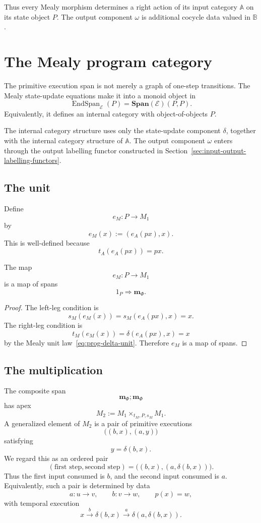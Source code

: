 Thus every Mealy morphism determines a right action of its input category \(\mathbb A\) on its state object \(P\). The output component \(\omega\) is additional cocycle data valued in \(\mathbb B\).

\section{The Mealy program category}
\label{sec:mealy-program-category}

The primitive execution span is not merely a graph of one-step transitions. The Mealy state-update equations make it into a monoid object in
\[
\operatorname{EndSpan}_{\mathcal E}(P)
=
\mathbf{Span}(\mathcal E)(P,P).
\]
Equivalently, it defines an internal category with object-of-objects \(P\).

The internal category structure uses only the state-update component \(\delta\), together with the internal category structure of \(\mathbb A\). The output component \(\omega\) enters through the output labelling functor constructed in Section~\ref{sec:input-output-labelling-functors}.

\subsection{The unit}

Define
\[
e_M:P\to M_1
\]
by
\[
e_M(x):=(e_A(p x),x).
\]
This is well-defined because
\[
t_A(e_A(p x))=p x.
\]

\begin{proposition}
\label{prop:program-unit-span-map}
The map
\[
e_M:P\to M_1
\]
is a map of spans
\[
1_P\Rightarrow \mathbf m_\Phi.
\]
\end{proposition}

\begin{proof}
The left-leg condition is
\[
s_M(e_M(x))
=
s_M(e_A(px),x)
=
x.
\]
The right-leg condition is
\[
t_M(e_M(x))
=
\delta(e_A(px),x)
=
x
\]
by the Mealy unit law~\eqref{eq:prog-delta-unit}. Therefore \(e_M\) is a map of spans.
\end{proof}

\subsection{The multiplication}

The composite span
\[
\mathbf m_\Phi;\mathbf m_\Phi
\]
has apex
\[
M_2:=M_1\times_{t_M,P,s_M}M_1.
\]
A generalized element of \(M_2\) is a pair of primitive executions
\[
\bigl((b,x),(a,y)\bigr)
\]
satisfying
\[
y=\delta(b,x).
\]
We regard this as an ordered pair
\[
(\text{first step},\text{second step})
=
\bigl((b,x),(a,\delta(b,x))\bigr).
\]
Thus the first input consumed is \(b\), and the second input consumed is \(a\). Equivalently, such a pair is determined by data
\[
a:u\to v,
\qquad
b:v\to w,
\qquad
p(x)=w,
\]
with temporal execution
\[
x\xrightarrow{b}\delta(b,x)
\xrightarrow{a}\delta(a,\delta(b,x)).
\]

